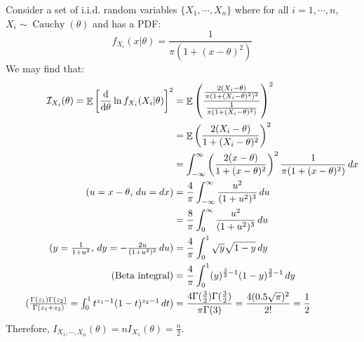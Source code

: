 \documentclass{huhtakm-template-book-v2}
\DeclareMathOperator{\E}{\mathbb{E}}
\DeclareMathOperator{\Cauchy}{Cauchy}
\begin{document}
\begin{eg}
	Consider a set of i.i.d. random variables $\{X_{1},\cdots,X_{n}\}$ where for all $i=1,\cdots,n$, $X_{i}\sim\Cauchy(\theta)$ and has a PDF:
	\begin{equation*}
		f_{X_{i}}(x|\theta)=\frac{1}{\pi(1+(x-\theta)^{2})}
	\end{equation*}
	We may find that:
	\begin{align*}
		\mathcal{I}_{X_{i}}(\theta)=\E\left[\odv*{}{\theta}\ln{f_{X_{i}}(X_{i}|\theta)}\right]^{2}&=\E\left(\frac{\frac{2(X_{i}-\theta)}{\pi(1+(X_{i}-\theta)^{2})^{2}}}{\frac{1}{\pi(1+(X_{i}-\theta)^{2})}}\right)^{2}\\
		&=\E\left(\frac{2(X_{i}-\theta)}{1+(X_{i}-\theta)^{2}}\right)^{2}\\
		&=\intinfty\left(\frac{2(x-\theta)}{1+(x-\theta)^{2}}\right)^{2}\frac{1}{\pi(1+(x-\theta)^{2})}\,dx\\
		\tag{$u=x-\theta$, $du=dx$}
		&=\frac{4}{\pi}\intinfty\frac{u^{2}}{(1+u^{2})^{3}}\,du\\
		&=\frac{8}{\pi}\int_{0}^{\infty}\frac{u^{2}}{(1+u^{2})^{3}}\,du\\
		\tag{$y=\frac{1}{1+u^{2}}$, $dy=-\frac{2u}{(1+u^{2})^{2}}\,du$}
		&=\frac{4}{\pi}\int_{0}^{1}\sqrt{y}\sqrt{1-y}\,dy\\
		\tag{Beta integral}
		&=\frac{4}{\pi}\int_{0}^{1}(y)^{\frac{3}{2}-1}(1-y)^{\frac{3}{2}-1}\,dy\\
		\tag{$\frac{\Gamma(z_{1})\Gamma(z_{2})}{\Gamma(z_{1}+z_{2})}=\int_{0}^{1}t^{z_{1}-1}(1-t)^{z_{2}-1}\,dt$}
		&=\frac{4\Gamma(\frac{3}{2})\Gamma(\frac{3}{2})}{\pi\Gamma(3)}=\frac{4(0.5\sqrt{\pi})^{2}}{2!}=\frac{1}{2}
	\end{align*}
	Therefore, $I_{X_{1},\cdots,X_{n}}(\theta)=nI_{X_{1}}(\theta)=\frac{n}{2}$.
\end{eg}
\end{document}
